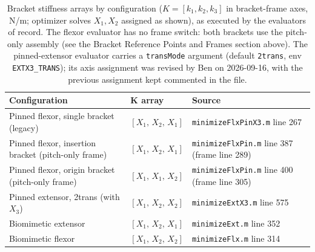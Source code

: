 \begin{table}[htbp]
\caption{Bracket stiffness arrays by configuration ($K = [k_{1}, k_{2}, k_{3}]$ in bracket-frame axes, N/m; optimizer solves $X_{1}, X_{2}$ assigned as shown), as executed by the evaluators of record. The flexor evaluator has no frame switch: both brackets use the pitch-only assembly (see the Bracket Reference Points and Frames section above). The pinned-extensor evaluator carries a \texttt{transMode} argument (default \texttt{2trans}, env \texttt{EXTX3\_TRANS}); its axis assignment was revised by Ben on 2026-09-16, with the previous assignment kept commented in the file.}
\label{tab:app_stiffness_arrays}
\begin{tabular}{@{}lll@{}}
\toprule
\textbf{Configuration} & $\boldsymbol{K}$ array & \textbf{Source} \\
\midrule
Pinned flexor, single bracket (legacy)       & $[X_{1},\,X_{2},\,X_{1}]$ & \texttt{minimizeFlxPinX3.m} line 267 \\
Pinned flexor, insertion bracket (pitch-only frame)    & $[X_{1},\,X_{2},\,X_{1}]$ & \texttt{minimizeFlxPin.m} line 387 (frame line 289) \\
Pinned flexor, origin bracket (pitch-only frame) & $[X_{1},\,X_{1},\,X_{2}]$ & \texttt{minimizeFlxPin.m} line 400 (frame line 305) \\
Pinned extensor, 2trans (with $X_{3}$)      & $[X_{1},\,X_{2},\,X_{2}]$ & \texttt{minimizeExtX3.m} line 575 \\
Biomimetic extensor                 & $[X_{1},\,X_{2},\,X_{1}]$ & \texttt{minimizeExt.m} line 352 \\
Biomimetic flexor                   & $[X_{1},\,X_{2},\,X_{2}]$ & \texttt{minimizeFlx.m} line 314 \\
\bottomrule
\end{tabular}
\end{table}

